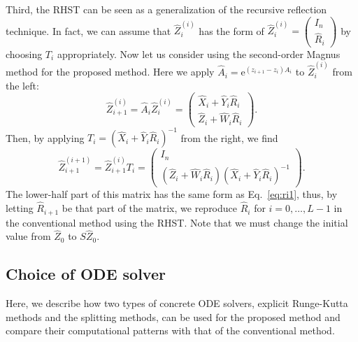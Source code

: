 \documentclass[preprint, 5p, times, sort&compress]{elsarticle}
\def\ee{\mathrm{e}}
\begin{document}
        Third, the RHST can be seen as a generalization of the recursive reflection technique.
        In fact, we can assume that $\hat{Z}_i^{(i)}$ has the form of
        $\hat{Z}_{i}^{(i)} = \begin{pmatrix} I_n \\ \hat{R}_i\end{pmatrix}$
        by choosing $T_i$ appropriately.
        Now let us consider using the second-order Magnus method for the proposed method.
        Here we apply $\hat{A}_i=\ee^{(z_{i+1}-z_i)A_i}$ to $\hat{Z}_{i}^{(i)}$ from the left:
        \begin{equation}
                \hat{Z}_{i+1}^{(i)} = \hat{A}_i \hat{Z}_{i}^{(i)} = \begin{pmatrix}\hat{X}_i+\hat{Y}_i\hat{R}_i \\ \hat{Z}_i+\hat{W}_i\hat{R}_i\end{pmatrix}.
        \end{equation}
        Then, by applying $T_i=\left(\hat{X}_i+\hat{Y}_i\hat{R}_i\right)^{-1}$ from the right, we find
        \begin{equation}
                \hat{Z}_{i+1}^{(i+1)}=\hat{Z}_{i+1}^{(i)}T_i=\begin{pmatrix}
                        I_n \\
                        \left(\hat{Z}_i+\hat{W}_i\hat{R}_i\right)\left(\hat{X}_i+\hat{Y}_i\hat{R}_i\right)^{-1}
                \end{pmatrix}.
        \end{equation}
        The lower-half part of this matrix has the same form as Eq.~\eqref{eq:ri1},
        thus, by letting $\hat{R}_{i+1}$ be that part of the matrix,
        we reproduce $\hat{R}_i$ for $i=0,\ldots,L-1$ in the conventional method using the RHST.
        Note that we must change the initial value from $\hat{Z}_0$ to $S\hat{Z}_0$.

        \subsection{Choice of ODE solver}
        Here, we describe how two types of concrete ODE solvers,
        explicit Runge-Kutta methods and the splitting methods, can be used for the proposed method
        and compare their computational patterns with that of the conventional method.
\end{document}
